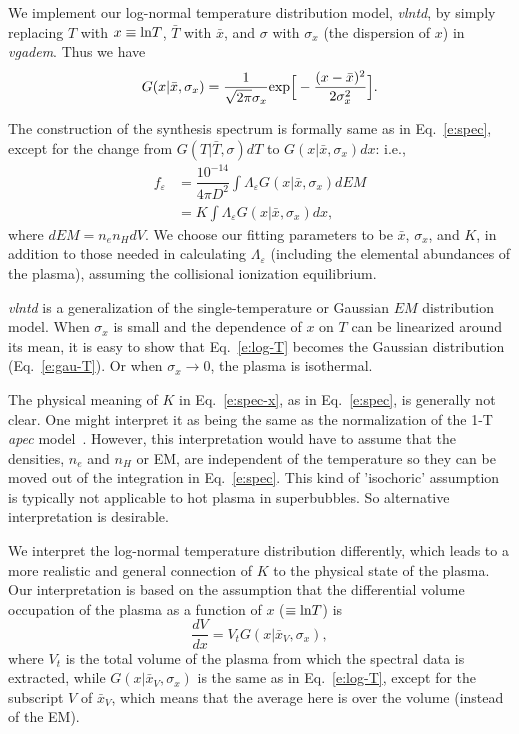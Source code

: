 \documentclass[usenatbib]{mnras}
\begin{document}
We implement our log-normal temperature distribution model, {\sl vlntd}, by simply replacing $T$ with $x \equiv {\rm ln} T$,  $\bar{T}$ with  $\bar{x}$, and  $\sigma$ with $\sigma_x$ (the dispersion of $x$) in {\sl vgadem}. Thus we have
\begin{equation}  G(x|\bar{x},\sigma_x)=\dfrac{1}{\sqrt{2\pi } \sigma_x} {\rm exp}\Big[-\dfrac{(x - \bar{x})^2}{2\sigma_x^2}\Big].
  \label{e:log-T}
\end{equation}

The construction of the synthesis spectrum is formally same as in Eq.~\ref{e:spec}, except for the change from $G(T|\bar{T},\sigma) dT$ to $G(x|\bar{x},\sigma_x) dx$: i.e.,
\begin{equation}
\begin{split}
f_\varepsilon & = \dfrac{10^{-14}}{4\pi D^2} \int \Lambda_\varepsilon G(x|\bar{x},\sigma_x) dEM\\
& = K \int \Lambda_\varepsilon G(x|\bar{x},\sigma_x) dx,
\end{split}
\label{e:spec-x}
\end{equation}
where $dEM = n_e n_H dV$.
 We choose our fitting parameters to be  $\bar{x}$,  $\sigma_x$, and $K$, in addition to those needed in calculating $\Lambda_\varepsilon$ (including the elemental abundances of the plasma), assuming the collisional ionization equilibrium. 

{\sl vlntd} is a generalization of the single-temperature or Gaussian $EM$ distribution model. 
When $\sigma_x$ is small and the dependence of $x$ on $T$ can be linearized around its mean, it is easy to show that Eq.~\ref{e:log-T} becomes the Gaussian distribution (Eq.~\ref{e:gau-T}). Or when $\sigma_x \rightarrow 0$, the plasma is isothermal. 

The physical meaning of $K$ in Eq.~\ref{e:spec-x}, 
as in Eq.~\ref{e:spec},  is generally not clear. One might interpret it as being the same as the normalization of the 1-T {\sl apec} model~\citep[e.g.][]{deplaa,Mao}. 
However, this interpretation would have to assume that the densities, $n_e$ and $n_H$ or EM, are independent of the temperature so they can be moved out of the integration in Eq.~\ref{e:spec}. This kind of 'isochoric' assumption is typically not applicable to hot plasma in superbubbles. So alternative interpretation is desirable.

We interpret the log-normal temperature distribution differently, which leads to a more realistic and general connection of $K$ to the physical state of the plasma.  Our interpretation is based on the assumption that the differential volume occupation  of the plasma as a function of $x$ ($\equiv {\rm ln} T$) is 
\begin{equation}
\dfrac{dV}{dx} = V_t G(x|\bar{x}_V,\sigma_x),
\label{e:dv}
\end{equation}
where $V_t$ is the total volume of the plasma from which the spectral data is extracted, while $ G(x|\bar{x}_V,\sigma_x)$ is the same  as in Eq.~\ref{e:log-T}, except for the subscript $V$ of $\bar{x}_V$, which means that the average here is over the volume (instead of the EM).
\end{document}
